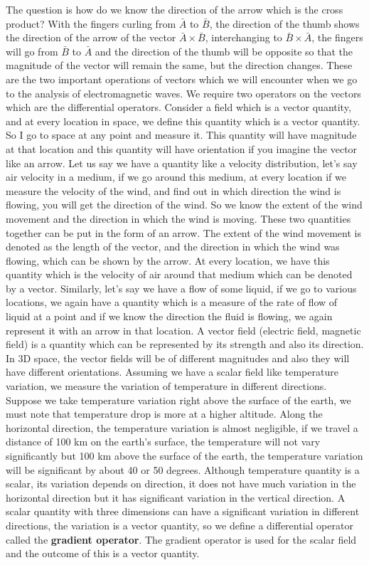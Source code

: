The question is how do we know the direction of the arrow which is the cross product? With the fingers curling from $\bar{A}$ to $\bar{B}$, the direction of the thumb shows the direction of the arrow of the vector $\bar{A} \times \bar{B}$, interchanging to $\bar{B} \times \bar{A}$, the fingers will go from $\bar{B}$ to $\bar{A}$ and the direction of the thumb will be opposite so that the magnitude of the vector will remain the same, but the direction changes. These are the two important operations of vectors which we will encounter when we go to the analysis of electromagnetic waves. We require two operators on the vectors which are the differential operators. Consider a field which is a vector quantity, and at every location in space, we define this quantity which is a vector quantity. So I go to space at any point and measure it. This quantity will have magnitude at that location and this quantity will have orientation if you imagine the vector like an arrow. Let us say we have a quantity like a velocity distribution, let's say air velocity in a medium, if we go around this medium, at every location if we measure the velocity of the wind, and find out in which direction the wind is flowing, you will get the direction of the wind. So we know the extent of the wind movement and the direction in which the wind is moving. These two quantities together can be put in the form of an arrow. The extent of the wind movement is denoted as the length of the vector, and the direction in which the wind was flowing, which can be shown by the arrow. At every location, we have this quantity which is the velocity of air around that medium which can be denoted by a vector. Similarly, let's say we have a flow of some liquid, if we go to various locations, we again have a quantity which is a measure of the rate of flow of liquid at a point and if we know the direction the fluid is flowing, we again represent it with an arrow in that location. A vector field (electric field, magnetic field) is a quantity which can be represented by its strength and also its direction. In 3D space, the vector fields will be of different magnitudes and also they will have different orientations. Assuming we have a scalar field like temperature variation, we measure the variation of temperature in different directions. Suppose we take temperature variation right above the surface of the earth, we must note that temperature drop is more at a higher altitude. Along the horizontal direction, the temperature variation is almost negligible, if we travel a distance of 100 km on the earth's surface, the temperature will not vary significantly but 100 km above the surface of the earth, the temperature variation will be significant by about 40 or 50 degrees. Although temperature quantity is a scalar, its variation depends on direction, it does not have much variation in the horizontal direction but it has significant variation in the vertical direction. A scalar quantity with three dimensions can have a significant variation in different directions, the variation is a vector quantity, so we define a differential operator called the \textbf{gradient operator}. The gradient operator is used for the scalar field and the outcome of this is a vector quantity.

